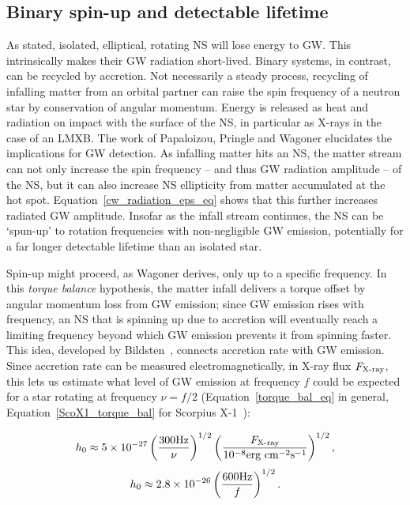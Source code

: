             \subsection{Binary spin-up and detectable lifetime}
            \label{spin-up}
         
As stated, isolated, elliptical, rotating NS will lose energy to GW.
This intrinsically makes their GW radiation short-lived.
Binary systems, in contrast, can be recycled by accretion.
Not necessarily a steady process, recycling of infalling matter from an orbital partner can raise the spin frequency of a neutron star by conservation of angular momentum.
Energy is released as heat and radiation on impact with the surface of the NS, in particular as X-rays in the case of an LMXB.
The work of Papaloizou, Pringle and Wagoner elucidates the implications for GW detection.
As infalling matter hits an NS, the matter stream can not only increase the spin frequency -- and thus GW radiation amplitude -- of the NS, but it can also increase NS ellipticity from matter accumulated at the hot spot.
Equation~\ref{cw_radiation_eps_eq} shows that this further increases radiated GW amplitude.
Insofar as the infall stream continues, the NS can be `spun-up' to rotation frequencies with non-negligible GW emission, potentially for a far longer detectable lifetime than an isolated star.

Spin-up might proceed, as Wagoner derives, only up to a specific frequency.
In this \textit{torque balance} hypothesis, the matter infall delivers a torque offset by angular momentum loss from GW emission; since GW emission rises with frequency, an NS that is spinning up due to accretion will eventually reach a limiting frequency beyond which GW emission prevents it from spinning faster.
This idea, developed by Bildsten~\cite{Bildsten1998}, connects accretion rate with GW emission.
Since accretion rate can be measured electromagnetically, in X-ray flux $F_\textup{X-ray}$, this lets us estimate what level of GW emission at frequency $f$ could be expected for a star rotating at frequency $\nu = f/2$ (Equation~\ref{torque_bal_eq} in general, Equation~\ref{ScoX1_torque_bal} for Scorpius X-1~\cite{GoetzThesis,Bildsten1998}): 

\begin{equation}
h_{0} \approx 5\times10^{-27}\left(\frac{300\textup{Hz}}{\nu}\right)^{1/2}\left(\frac{F_\textup{X-ray}}{10^{-8}\textup{erg cm}^{-2}\textup{s}^{-1}}\right)^{1/2},
\label{torque_bal_eq}
\end{equation}
\begin{equation}
h_{0} \approx 2.8\times10^{-26}\left(\frac{600\textup{Hz}}{f}\right)^{1/2}.
\label{ScoX1_torque_bal}
\end{equation}




